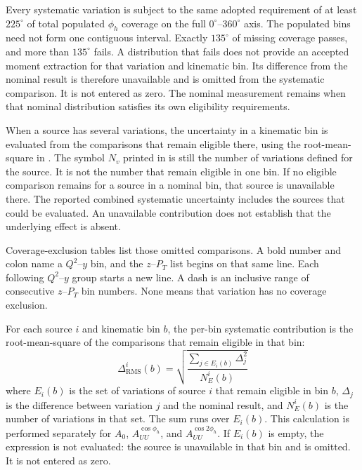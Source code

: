 Every systematic variation is subject to the same adopted requirement of at least $225^{\circ}$ of total populated $\phi_h$ coverage on the full $0^{\circ}$--$360^{\circ}$ axis. The populated bins need not form one contiguous interval. Exactly $135^{\circ}$ of missing coverage passes, and more than $135^{\circ}$ fails. A distribution that fails does not provide an accepted moment extraction for that variation and kinematic bin. Its difference from the nominal result is therefore unavailable and is omitted from the systematic comparison. It is not entered as zero. The nominal measurement remains when that nominal distribution satisfies its own eligibility requirements.

When a source has several variations, the uncertainty in a kinematic bin is evaluated from the comparisons that remain eligible there, using the root-mean-square in . The symbol \(N_{v}\) printed in  is still the number of variations defined for the source. It is not the number that remain eligible in one bin. If no eligible comparison remains for a source in a nominal bin, that source is unavailable there. The reported combined systematic uncertainty includes the sources that could be evaluated. An unavailable contribution does not establish that the underlying effect is absent.

Coverage-exclusion tables list those omitted comparisons. A bold number and colon name a $Q^{2}$--$y$ bin, and the $z$--$P_{T}$ list begins on that same line. Each following $Q^{2}$--$y$ group starts a new line. A dash is an inclusive range of consecutive $z$--$P_{T}$ bin numbers. None means that variation has no coverage exclusion.

For each source $i$ and kinematic bin $b$, the per-bin systematic contribution is the root-mean-square of the comparisons that remain eligible in that bin:
\begin{equation}
    \Delta_{\mathrm{RMS}}^{i}(b) = \sqrt{\frac{\sum_{j \in E_{i}(b)} \Delta_{j}^{2}}{N_{E}^{i}(b)}}
    \label{eq:SystematicRMS}
\end{equation}
where $E_{i}(b)$ is the set of variations of source $i$ that remain eligible in bin $b$, $\Delta_{j}$ is the difference between variation $j$ and the nominal result, and $N_{E}^{i}(b)$ is the number of variations in that set. The sum runs over $E_{i}(b)$. This calculation is performed separately for $A_{0}$, $A_{UU}^{\cos\phi_h}$, and $A_{UU}^{\cos 2\phi_h}$. If $E_{i}(b)$ is empty, the expression is not evaluated: the source is unavailable in that bin and is omitted. It is not entered as zero.

